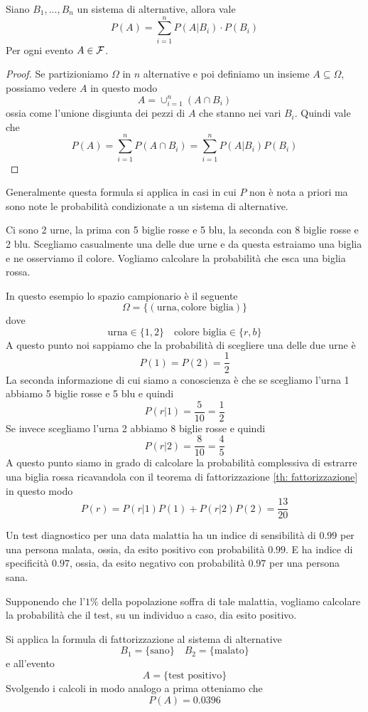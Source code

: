 \begin{theorem}[Fattorizzazione]\label{th: fattorizzazione}
	Siano $B_1, ..., B_n$ un sistema di alternative, allora vale 
	\[ P(A) = \sum_{i=1}^n P(A | B_i) \cdot P(B_i) \]
	Per ogni evento $A \in \mathcal{F}$.
	\begin{proof}
		Se partizioniamo $\Omega$ in $n$ alternative e poi definiamo un insieme
		$A \subseteq \Omega$, possiamo vedere $A$ in questo modo
		\[ A = \cup_{i=1}^n (A \cap B_i) \]
		ossia come l'unione disgiunta dei pezzi di $A$ che stanno nei vari $B_i$. Quindi vale che
		\[ P(A) = \sum_{i=1}^n P(A \cap B_i) = \sum_{i=1}^n P(A | B_i) P(B_i) \]
	\end{proof}
\end{theorem}

Generalmente questa formula si applica in casi in cui $P$ non è nota a priori ma sono note le
probabilità condizionate a un sistema di alternative.

\begin{example}
	Ci sono 2 urne, la prima con 5 biglie rosse e 5 blu, la seconda con 8 biglie rosse e 2 blu.
	Scegliamo casualmente una delle due urne e da questa estraiamo una biglia e ne osserviamo il
	colore. Vogliamo calcolare la probabilità che esca una biglia rossa.

	In questo esempio lo spazio campionario è il seguente 
	\[ \Omega = \{ (\text{urna}, \text{colore biglia}) \} \]
	dove 
	\[ \text{urna} \in \{ 1, 2 \} \quad \text{colore biglia} \in \{ r, b \} \]
	A questo punto noi sappiamo che la probabilità di scegliere una delle due urne è 
	\[ P(1) = P(2) = \frac{1}{2} \]
	La seconda informazione di cui siamo a conoscienza è che se scegliamo l'urna 1 abbiamo 5
	biglie rosse e 5 blu e quindi 
	\[ P(r | 1) = \frac{5}{10} = \frac{1}{2} \]
	Se invece scegliamo l'urna 2 abbiamo 8 biglie rosse e quindi 
	\[ P(r | 2) = \frac{8}{10} = \frac{4}{5} \]
	A questo punto siamo in grado di calcolare la probabilità complessiva di estrarre una biglia
	rossa ricavandola con il teorema di fattorizzazione \ref{th: fattorizzazione} in questo modo
	\[ P(r) = P(r | 1) P(1) + P(r | 2) P(2) = \frac{13}{20} \]
\end{example}

\begin{example}
	Un test diagnostico per una data malattia ha un indice di sensibilità di $0.99$ per una
	persona malata, ossia, da esito positivo con probabilità $0.99$. E ha indice di specificità
	$0.97$, ossia, da esito negativo con probabilità $0.97$ per una persona sana.

	Supponendo che l'$1\%$ della popolazione soffra di tale malattia, vogliamo calcolare la
	probabilità che il test, su un individuo a caso, dia esito positivo.

	Si applica la formula di fattorizzazione al sistema di alternative
	\[ B_1 = \{ \text{sano} \} \quad B_2 = \{ \text{malato} \} \]
	e all'evento 
	\[ A = \{ \text{test positivo} \} \]
	Svolgendo i calcoli in modo analogo a prima otteniamo che
	\[ P(A) = 0.0396 \]
\end{example}

